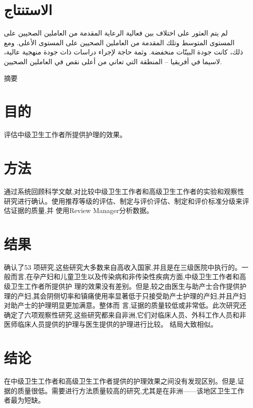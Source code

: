 \documentclass{article}
\begin{document}
\section{الاستنتاج}

لم يتم العثور
على اختلاف بين
فعالية
الرعاية
المقدمة من
العاملين
الصحيين على
المستوى
المتوسط وتلك
المقدمة من
العاملين
الصحيين على
المستوى
الأعلى. ومع
ذلك، كانت جودة
البينّات
منخفضة. وثمة
حاجة لإجراء
دراسات ذات
جودة منهجية
عالية، لاسيما
في أفريقيا –
المنطقة التي
تعاني من أعلى
نقص في
العاملين
الصحيين.

摘要\section{目的}

评估中级卫生工作者所提供护理的效果。

\section{方法}

通过系统回顾科学文献,对比较中级卫生工作者和高级卫生工作者的实验和观察性研究进行确认。使用推荐等级的评估、制定与评价评估、制定和评价标准分级来评估证据的质量,并
使用Review
Manager分析数据。

\section{结果}

确认了53
项研究,这些研究大多数来自高收入国家,并且是在三级医院中执行的。一般而言,在孕产妇和儿童卫生以及传染病和非传染性疾病方面,中级卫生工作者和高级卫生工作者所提供护
理的效果没有差别。但是,较之由医生与助产士合作提供护理的产妇,其会阴侧切率和镇痛使用率显著低于只接受助产士护理的产妇,并且产妇对助产士的护理明显更加满意。整体而
言,证据的质量较低或非常低。此次研究还确定了六项观察性研究,这些研究都来自非洲,它们对临床人员、外科工作人员和非医师临床人员提供的护理与医生提供的护理进行比较。
结局大致相似。

\section{结论}

在中级卫生工作者和高级卫生工作者提供的护理效果之间没有发现区别。但是,证据的质量很低。需要进行方法质量较高的研究,尤其是在非洲——该地区卫生工作者最为短缺。
\end{document}
